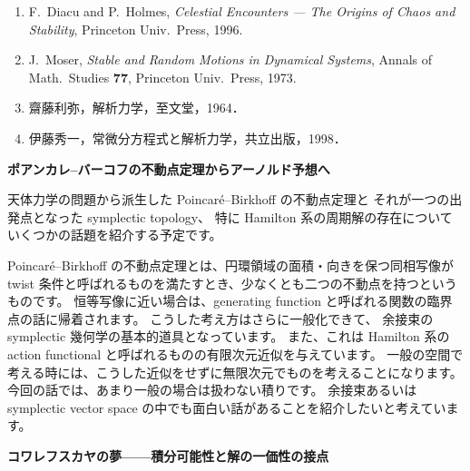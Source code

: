 \documentclass[uplatex,dvipdfmx]{jlreq}
\begin{document}
\begin{enumerate}
  \setlength{\itemsep}{2pt}
  \item F.~Diacu and P.~Holmes,
        \textit{Celestial Encounters --- The Origins of Chaos and Stability},
        Princeton Univ.\ Press, 1996.
  \item J.~Moser,
        \textit{Stable and Random Motions in Dynamical Systems},
        Annals of Math.\ Studies \textbf{77}, Princeton Univ.\ Press, 1973.
  \item 齋藤利弥，解析力学，至文堂，1964．
  \item 伊藤秀一，常微分方程式と解析力学，共立出版，1998．
\end{enumerate}

\newpage

\noindent
{\large\bfseries ポアンカレ--バーコフの不動点定理からアーノルド予想へ}

\medskip
\hspace*{\fill}{\large\bfseries 小野 薫（北大・理）}

\bigskip\bigskip

天体力学の問題から派生した Poincaré--Birkhoff の不動点定理と
それが一つの出発点となった symplectic topology、
特に Hamilton 系の周期解の存在についていくつかの話題を紹介する予定です。

Poincaré--Birkhoff の不動点定理とは、円環領域の面積・向きを保つ同相写像が
twist 条件と呼ばれるものを満たすとき、少なくとも二つの不動点を持つというものです。
恒等写像に近い場合は、generating function と呼ばれる関数の臨界点の話に帰着されます。
こうした考え方はさらに一般化できて、
余接束の symplectic 幾何学の基本的道具となっています。
また、これは Hamilton 系の action functional と呼ばれるものの有限次元近似を与えています。
一般の空間で考える時には、こうした近似をせずに無限次元でものを考えることになります。
今回の話では、あまり一般の場合は扱わない積りです。
余接束あるいは symplectic vector space の中でも面白い話があることを紹介したいと考えています。

\newpage

\noindent
{\large\bfseries コワレフスカヤの夢——積分可能性と解の一価性の接点}

\medskip
\hspace*{\fill}{\large\bfseries 吉田 春夫（国立天文台）}
\end{document}
